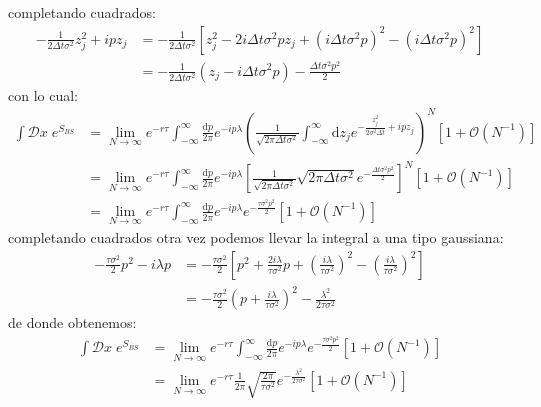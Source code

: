 \documentclass[11pt,a4paper]{article}
\begin{document}
completando cuadrados:
\begin{equation}
\begin{split}
- \frac{1}{2\Delta t \sigma^2} z_j^2 + i p z_j & = - \frac{1}{2\Delta t \sigma^2} \left[ z_j^2 - 2i\Delta t \sigma^2 p z_j + \left( i\Delta t \sigma^2p \right)^2 - \left( i\Delta t \sigma^2p \right)^2 \right]\\
& = - \frac{1}{2\Delta t \sigma^2} \left( z_j -  i\Delta t \sigma^2p \right) -\frac{\Delta t \sigma^2p^2}{2}
\end{split}
\label{eq:completingthesquare1}
\end{equation}
con lo cual:
\begin{equation}
\begin{split}
\int\mathcal{D}x \; e^{S_{BS}} & = \lim_{N\rightarrow \infty}e^{-r\tau} \int_{-\infty}^{\infty}\frac{\mathrm{d}p}{2\pi}  e^{-ip\lambda} \left( \frac{1}{\sqrt{2\pi\Delta t\sigma^2}}\int_{-\infty}^\infty \mathrm{d}z_j e^{-\frac{z_j^2}{2\sigma^2\Delta t} + ipz_j} \right)^N   \left[ 1 + \mathcal{O} \left( N^{-1} \right) \right] \\
& = \lim_{N\rightarrow \infty}e^{-r\tau} \int_{-\infty}^{\infty}\frac{\mathrm{d}p}{2\pi}  e^{-ip\lambda} \left[ \frac{1}{\sqrt{2\pi\Delta t\sigma^2}}
\sqrt{2\pi \Delta t \sigma^2}e^{-\frac{\Delta t \sigma^2 p^2}{2}} \right]^N \left[ 1 + \mathcal{O} \left( N^{-1} \right) \right] \\
& =  \lim_{N\rightarrow \infty}e^{-r\tau} \int_{-\infty}^{\infty}\frac{\mathrm{d}p}{2\pi}  e^{-ip\lambda} e^{-\frac{\tau \sigma^2 p^2}{2}} \left[ 1 + \mathcal{O} \left( N^{-1} \right) \right]
\end{split}
\label{eq:blackscholespropagator11}
\end{equation}
completando cuadrados otra vez podemos llevar la integral a una tipo gaussiana:
\begin{equation}
\begin{split}
-\frac{\tau\sigma^2}{2} p^2 - i \lambda p & = -\frac{\tau\sigma^2}{2} \left[ p^2 + \frac{2i\lambda}{\tau\sigma^2} p + \left( \frac{i\lambda}{\tau \sigma^2} \right)^2 - \left( \frac{i\lambda}{\tau \sigma^2} \right)^2 \right] \\
& = -\frac{\tau\sigma^2}{2} \left( p + \frac{i\lambda}{\tau \sigma^2} \right)^2 - \frac{\lambda^2}{2\tau \sigma^2}
\end{split}
\label{eq:completingthesquare1}
\end{equation}
de donde obtenemos:
\begin{equation}
\begin{split}
\int\mathcal{D}x \; e^{S_{BS}} & = \lim_{N\rightarrow \infty}e^{-r\tau} \int_{-\infty}^{\infty}\frac{\mathrm{d}p}{2\pi}  e^{-ip\lambda} e^{-\frac{\tau \sigma^2 p^2}{2}} \left[ 1 + \mathcal{O} \left( N^{-1} \right) \right] \\
& = \lim_{N\rightarrow \infty}e^{-r\tau} \frac{1}{2\pi}\sqrt{\frac{2\pi}{\tau\sigma^2}}e^{-\frac{\lambda^2}{2\tau\sigma^2}} \left[ 1 + \mathcal{O} \left( N^{-1} \right) \right]
\end{split}
\label{eq:blackscholespropagator12}
\end{equation}
\end{document}
